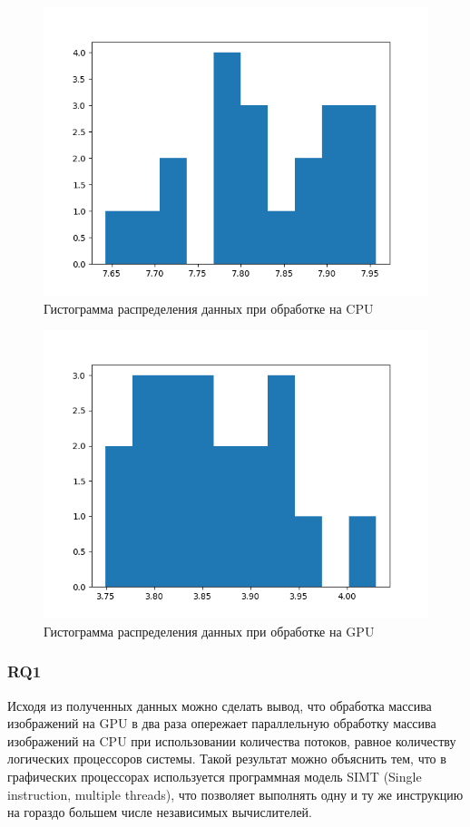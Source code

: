 \begin{figure}[H]
    \centering
    \includegraphics[width=\textwidth]{figures/CPU.png}
    \caption{Гистограмма распределения данных при обработке на CPU}
    \label{fig:cpu}
\end{figure}

\begin{figure}[H]
    \centering
    \includegraphics[width=\textwidth]{figures/GPU.png}
    \caption{Гистограмма распределения данных при обработке на GPU}
    \label{fig:gpu}
\end{figure}

\subsubsection{RQ1}
Исходя из полученных данных можно сделать вывод, что обработка массива изображений на GPU в два раза опережает параллельную обработку массива изображений на CPU при использовании количества потоков, равное количеству логических процессоров системы. Такой результат можно объяснить тем, что в графических процессорах используется программная модель SIMT (Single instruction, multiple threads), что позволяет выполнять одну и ту же инструкцию на гораздо большем числе независимых вычислителей.
